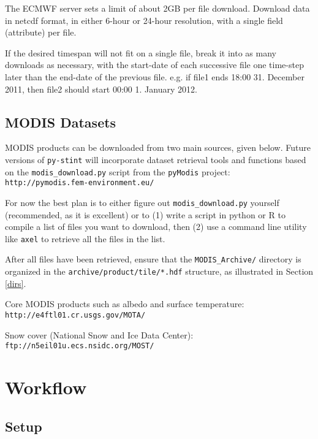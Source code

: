 \documentclass[twoside,a4paper]{refart}
\begin{document}
\attention
The ECMWF server sets a limit of about 2GB per file download.  Download data in netcdf format, in either 6-hour or 24-hour resolution, with a single field (attribute) per file. 

If the desired timespan will not fit on a single file, break it into as many downloads as necessary, with the start-date of each successive file one time-step later than the end-date of the previous file. e.g. if file1 ends 18:00 31. December 2011, then file2 should start 00:00 1. January 2012.

\subsection{MODIS Datasets}\label{modis}
MODIS products can be downloaded from two main sources, given below.  Future versions of \texttt{py-stint} will incorporate dataset retrieval tools and functions based on the \texttt{modis\_download.py} script from the \texttt{pyModis} project:
\texttt{http://pymodis.fem-environment.eu/}

For now the best plan is to either figure out \texttt{modis\_download.py} yourself (recommended, as it is excellent) or to (1) write a script in python or R to compile a list of files you want to download, then (2) use a command line utility like \texttt{axel} to retrieve all the files in the list.

After all files have been retrieved, ensure that the \texttt{MODIS\_Archive/} directory is organized in the \texttt{archive/product/tile/*.hdf} structure, as illustrated in Section \ref{dirs}. 

Core MODIS products such as albedo and surface temperature:\\
\texttt{http://e4ftl01.cr.usgs.gov/MOTA/}


Snow cover (National Snow and Ice Data Center):\\
\texttt{ftp://n5eil01u.ecs.nsidc.org/MOST/}

\newpage
\section{Workflow}\label{run}

\subsection{Setup}
\end{document}
